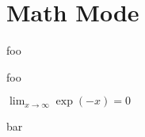

\section{Math Mode
}
{\mktsStyleItalic{}foo}\mktsShowpar\par
{\mktsStyleCode{}foo}\mktsShowpar\par
$\lim_{x \to \infty} \exp(-x) = 0$\mktsShowpar\par
bar\mktsShowpar\par

